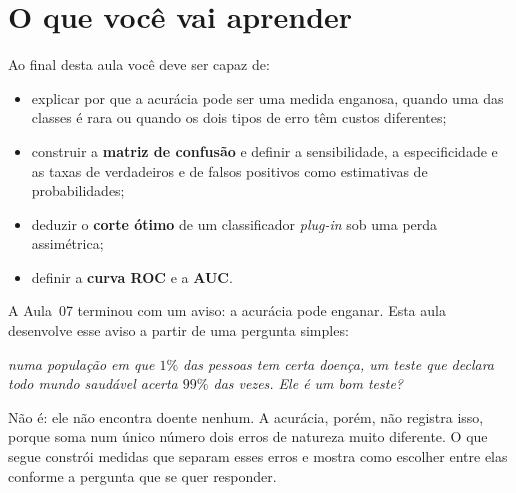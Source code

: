\documentclass[11pt,a4paper]{article}
\title{}
\date{}
\begin{document}

\section*{O que você vai aprender}
Ao final desta aula você deve ser capaz de:
\begin{itemize}[leftmargin=1.4cm]
  \item explicar por que a acurácia pode ser uma medida enganosa, quando uma das
        classes é rara ou quando os dois tipos de erro têm custos diferentes;
  \item construir a \textbf{matriz de confusão} e definir a sensibilidade, a
        especificidade e as taxas de verdadeiros e de falsos positivos como
        estimativas de probabilidades;
  \item deduzir o \textbf{corte ótimo} de um classificador \emph{plug-in} sob uma
        perda assimétrica;
  \item definir a \textbf{curva ROC} e a \textbf{AUC}.
\end{itemize}

\noindent
A Aula~07 terminou com um aviso: a acurácia pode enganar. Esta aula desenvolve esse
aviso a partir de uma pergunta simples:

\begin{center}\itshape
  numa população em que $1\%$ das pessoas tem certa doença, um teste que declara\\
  todo mundo saudável acerta $99\%$ das vezes. Ele é um bom teste?
\end{center}

\noindent
Não é: ele não encontra doente nenhum. A acurácia, porém, não registra isso, porque
soma num único número dois erros de natureza muito diferente. O que segue constrói
medidas que separam esses erros e mostra como escolher entre elas conforme a
pergunta que se quer responder.

\end{document}

